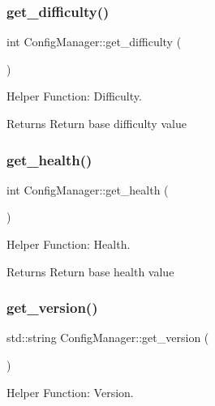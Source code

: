 \subsubsection{\texorpdfstring{get\+\_\+difficulty()}{get\_difficulty()}}
{\footnotesize\ttfamily int Config\+Manager\+::get\+\_\+difficulty (\begin{DoxyParamCaption}{ }\end{DoxyParamCaption})}



Helper Function\+: Difficulty. 

\begin{DoxyReturn}{Returns}
Return base difficulty value 
\end{DoxyReturn}
\mbox{\label{classConfigManager_af04d8201e892ce16381403a365f77cae}} 
\subsubsection{\texorpdfstring{get\+\_\+health()}{get\_health()}}
{\footnotesize\ttfamily int Config\+Manager\+::get\+\_\+health (\begin{DoxyParamCaption}{ }\end{DoxyParamCaption})}



Helper Function\+: Health. 

\begin{DoxyReturn}{Returns}
Return base health value 
\end{DoxyReturn}
\mbox{\label{classConfigManager_a7b6225b85d5d0766069cdcaf5e05186c}} 
\subsubsection{\texorpdfstring{get\+\_\+version()}{get\_version()}}
{\footnotesize\ttfamily std\+::string Config\+Manager\+::get\+\_\+version (\begin{DoxyParamCaption}{ }\end{DoxyParamCaption})}



Helper Function\+: Version. 

